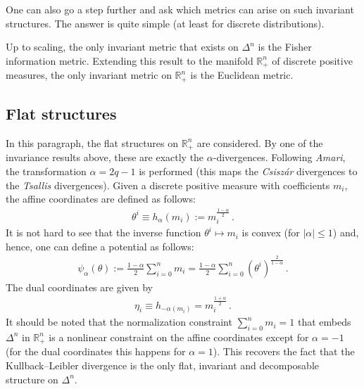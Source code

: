     One can also go a step further and ask which metrics can arise on such invariant structures. The answer is quite simple (at least for discrete distributions).
    \begin{theorem}[Chentsov]
        Up to scaling, the only invariant metric that exists on $\Delta^n$ is the Fisher information metric. Extending this result to the manifold $\mathbb{R}^n_+$ of discrete positive measures, the only invariant metric on $\mathbb{R}^n_+$ is the Euclidean metric.
    \end{theorem}

\subsection{Flat structures}

    In this paragraph, the flat structures on $\mathbb{R}^n_+$ are considered. By one of the invariance results above, these are exactly the $\alpha$-divergences. Following \textit{Amari}, the transformation $\alpha=2q-1$ is performed (this maps the \textit{Csisz\'ar} divergences to the \textit{Tsallis} divergences). Given a discrete positive measure with coefficients $m_i$, the affine coordinates are defined as follows:
    \begin{gather}
        \theta^i \equiv h_\alpha(m_i) := m_i^{\frac{1-\alpha}{2}}\,.
    \end{gather}
    It is not hard to see that the inverse function $\theta^i\mapsto m_i$ is convex (for $|\alpha|\leq1$) and, hence, one can define a potential as follows:
    \begin{gather}
        \psi_\alpha(\theta) := \frac{1-\alpha}{2}\sum_{i=0}^n m_i = \frac{1-\alpha}{2}\sum_{i=0}^n \left(\theta^i\right)^{\frac{2}{1-\alpha}}\,.
    \end{gather}
    The dual coordinates are given by
    \begin{gather}
        \eta_i \equiv h_{-\alpha(m_i)} = m_i^{\frac{1+\alpha}{2}}\,.
    \end{gather}
    It should be noted that the normalization constraint $\sum_{i=0}^nm_i=1$ that embeds $\Delta^n$ in $\mathbb{R}^n_+$ is a nonlinear constraint on the affine coordinates except for $\alpha=-1$ (for the dual coordinates this happens for $\alpha=1$). This recovers the fact that the Kullback--Leibler divergence is the only flat, invariant and decomposable structure on $\Delta^n$.

